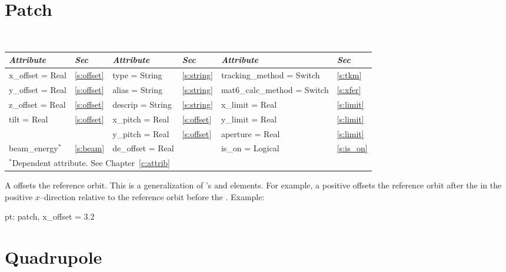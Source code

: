 {{%
\section{Patch}
\label{s:patch}

\begin{center}
\tt
\begin{tabular}{|l|l||l|l||l|l|} \hline
  {\sl Attribute} & {\sl Sec}  & {\sl Attribute} & {\sl Sec} & {\sl Attribute} & {\sl Sec} \\ \hline
  x\_offset  = Real  & \ref{s:offset} &  type = String      & \ref{s:string} & tracking\_method = Switch   & \ref{s:tkm}   \\ \hline
  y\_offset  = Real  & \ref{s:offset} &  alias = String     & \ref{s:string} & mat6\_calc\_method = Switch & \ref{s:xfer}  \\ \hline
  z\_offset  = Real  & \ref{s:offset} &  descrip = String   & \ref{s:string} & x\_limit = Real             & \ref{s:limit} \\ \hline
  tilt = Real        & \ref{s:offset} &  x\_pitch   = Real  & \ref{s:offset} & y\_limit = Real             & \ref{s:limit} \\ \hline
                     &                &  y\_pitch   = Real  & \ref{s:offset} & aperture = Real             & \ref{s:limit} \\ \hline
  beam\_energy$^*$   & \ref{s:beam}   &  de\_offset = Real  &                & is\_on = Logical            & \ref{s:is_on} \\ \hline
  \multicolumn{6}{l}{\small $^*$Dependent attribute. See Chapter~\ref{c:attrib}} \\
\end{tabular}
\end{center}
\toffset

A  offsets the reference orbit. This is a generalization of
\mad's  and  elements. For example, a positive
 offsets the reference orbit after the  in the
positive $x$--direction relative to the reference orbit before the
.
Example:
\begin{example}
  pt: patch, x\_offset = 3.2
\end{example}

\section{Quadrupole}
\label{s:quad}

}}
